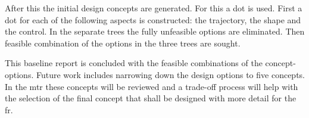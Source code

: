 After this the initial design concepts are generated. For this a \gls{dot} is used. First a \gls{dot} for each of the following aspects is constructed: the trajectory, the shape and the control. In the separate trees the fully unfeasible options are eliminated. Then feasible combination of the options in the three trees are sought.

This baseline report is concluded with the feasible combinations of the concept-options. Future work includes narrowing down the design options to five concepts. In the \acrfull{mtr} these concepts will be reviewed and a trade-off process will help with the selection of the final concept that shall be designed with more detail for the \acrfull{fr}.
